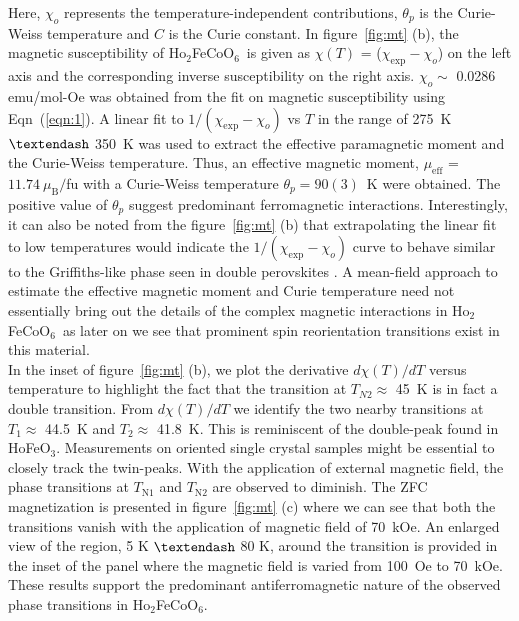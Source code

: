 \documentclass[12pt,twocolumns]{iopart}
\newcommand{\HFCO}{Ho$_2$FeCoO$_6$}
\newcommand{\HFO}{HoFeO$_{3}$}
\begin{document}
Here, $\chi_{o}$ represents the temperature-independent contributions,
$\theta_p$ is the Curie-Weiss temperature and $C$ is the Curie constant.
In figure~\ref{fig:mt} (b), the magnetic susceptibility
of \HFCO\ is given as $\chi(T)$ = ($\chi_\mathrm{exp} - \chi_o$) on the
left axis and the corresponding inverse susceptibility on the
right axis.
$\chi_o \sim$ 0.0286 emu/mol-Oe was obtained from the fit on
magnetic susceptibility using Eqn~(\ref{eqn:1}).
A linear fit to $1 /(\chi_\mathrm{exp} - \chi_o)$
vs $T$ in the range of 275~K $\textendash$ 350~K
was used to extract the effective paramagnetic moment and the Curie-Weiss temperature.
Thus, an effective magnetic moment, $\mu_\mathrm{eff}$ = $11.74~\mu_\mathrm{B}/$fu 
with a Curie-Weiss temperature
$\theta_{p} = 90(3)$~K were obtained.
The positive value of $\theta_{p}$ suggest predominant ferromagnetic 
interactions.
Interestingly, it can also be noted from the figure~\ref{fig:mt} (b) that extrapolating the
linear fit to low temperatures would indicate the
$1 /(\chi_\mathrm{exp} - \chi_o)$ curve to behave similar to the
Griffiths-like phase seen in double perovskites \cite{nair2011griffiths,liu2014griffiths,chakraborty2016disordered}.
A mean-field approach to estimate the effective magnetic moment and
Curie temperature need not essentially
bring out the details of the complex magnetic interactions
in \HFCO\, as later on we see that prominent spin reorientation
transitions exist in this material.
\\
%
In the inset of figure~\ref{fig:mt} (b), we plot the derivative $d\chi(T)/dT$
versus temperature to highlight the fact that the transition at
$T_{N2} \approx$ 45~K is in fact a double transition.
From $d\chi(T)/dT$ we identify the two nearby transitions at
$T_1 \approx$ 44.5~K and $T_2 \approx$ 41.8~K.
This is reminiscent of the double-peak
found in \HFO \cite{bhattacharjee2002heat}.
Measurements on oriented single crystal samples might be
essential to closely track the twin-peaks.
With the application of external magnetic field, the phase transitions
at $T_\mathrm{N1}$ and $T_\mathrm{N2}$ are observed to diminish.
The ZFC magnetization is presented in figure~\ref{fig:mt} (c)
where we can see that both the transitions vanish
with the application of magnetic field of 70~kOe.
An enlarged view of the region, 5 K $\textendash$ 80 K, around the 
transition is provided in the inset of the panel where the
magnetic field is varied from 100~Oe to 70~kOe.
These results support the predominant antiferromagnetic nature of the
observed phase transitions in \HFCO.
\\
\end{document}
